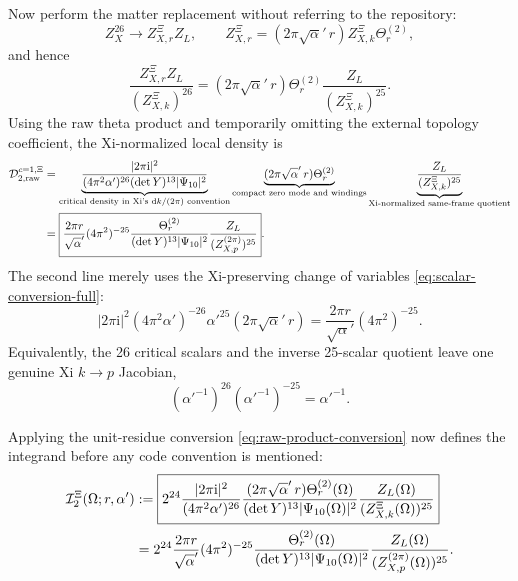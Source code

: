 \documentclass[11pt]{article}
\numberwithin{equation}{section}
\newcommand{\A}{\alpha'}
\newcommand{\dd}{\mathrm d}
\newcommand{\ii}{\mathrm i}
\newcommand{\cD}{\mathcal D}
\newcommand{\cI}{\mathcal I}
\begin{document}
Now perform the matter replacement without referring to the repository:
\begin{equation}
 Z_X^{26}\longrightarrow Z_{X,r}^\Xi Z_L,
 \qquad
 Z_{X,r}^\Xi=(2\pi\sqrt\A\,r)Z_{X,k}^\Xi\Theta_r^{(2)},
 \label{eq:c1-replacement-full}
\end{equation}
and hence
\begin{equation}
 \frac{Z_{X,r}^\Xi Z_L}{(Z_{X,k}^\Xi)^{26}}
 =(2\pi\sqrt\A\,r)\Theta_r^{(2)}
 \frac{Z_L}{(Z_{X,k}^\Xi)^{25}}.
 \label{eq:c1-replacement-quotient}
\end{equation}
Using the raw theta product and temporarily omitting the external topology
coefficient, the Xi-normalized local density is
\begin{align}
 \cD_{2,\rm raw}^{c=1,\Xi}
 &=\underbrace{\frac{|2\pi\ii|^2}
 {(4\pi^2\A)^{26}(\det Y)^{13}|\Psi_{10}|^2}}
 _{\text{critical density in Xi's }\dd k/(2\pi)\text{ convention}}
 \underbrace{(2\pi\sqrt\A\,r)\Theta_r^{(2)}}
 _{\text{compact zero mode and windings}}
 \underbrace{\frac{Z_L}{(Z_{X,k}^\Xi)^{25}}}
 _{\text{Xi-normalized same-frame quotient}} \notag\\
 &=\boxed{
 \frac{2\pi r}{\sqrt\A}(4\pi^2)^{-25}
 \frac{\Theta_r^{(2)}}{(\det Y)^{13}|\Psi_{10}|^2}
 \frac{Z_L}{(Z_{X,p}^{(2\pi)})^{25}}}.
 \label{eq:raw-local-density}
\end{align}
The second line merely uses the Xi-preserving change of variables
\eqref{eq:scalar-conversion-full}:
\begin{equation}
 |2\pi\ii|^2(4\pi^2\A)^{-26}
 \A^{25}(2\pi\sqrt\A\,r)
 =\frac{2\pi r}{\sqrt\A}(4\pi^2)^{-25}.
 \label{eq:correlated-scalar-conversion-full}
\end{equation}
Equivalently, the 26 critical scalars and the inverse 25-scalar quotient leave
one genuine Xi $k\to p$ Jacobian,
\begin{equation}
 (\A^{-1})^{26}(\A^{-1})^{-25}=\A^{-1}.
 \label{eq:26-minus-25}
\end{equation}

Applying the unit-residue conversion \eqref{eq:raw-product-conversion} now
defines the integrand before any code convention is mentioned:
\begin{align}
 \cI_2^\Xi(\Omega;r,\A)
 &:=\boxed{2^{24}\frac{|2\pi\ii|^2}{(4\pi^2\A)^{26}}
 \frac{(2\pi\sqrt\A\,r)\Theta_r^{(2)}(\Omega)}
 {(\det Y)^{13}|\Psi_{10}(\Omega)|^2}
 \frac{Z_L(\Omega)}{(Z_{X,k}^\Xi(\Omega))^{25}}} \notag\\
 &=2^{24}\frac{2\pi r}{\sqrt\A}(4\pi^2)^{-25}
 \frac{\Theta_r^{(2)}(\Omega)}
 {(\det Y)^{13}|\Psi_{10}(\Omega)|^2}
 \frac{Z_L(\Omega)}{(Z_{X,p}^{(2\pi)}(\Omega))^{25}}.
 \label{eq:I2Xi-full}
\end{align}
\end{document}
